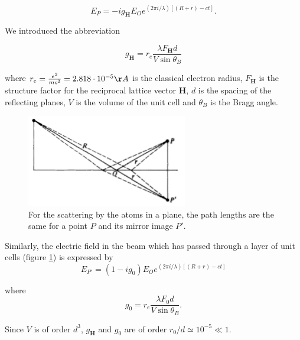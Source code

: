 \documentclass[12pt,oneside,notitlepage,abstracton,a4paper]{scrartcl}
\begin{document}
\begin{equation}
 E_P=-ig_\mathbf{H}E_Oe^{(2\pi i /\lambda)[(R+r)-ct]}.
\end{equation}

We introduced the abbreviation

\begin{equation}\label{eqg}
 g_\mathbf{H}=r_e\frac{\lambda F_\mathbf{H}d}{V \sin{\theta_B}}
\end{equation}

where $r_e=\frac{e^2}{mc^2}=2.818 \cdot 10^{-5} \AA{}$ is the classical electron radius, $F_\mathbf{H}$ is the structure factor for the reciprocal lattice vector $\mathbf{H}$, $d$ is the spacing of the reflecting planes, $V$ is the volume of the unit cell and $\theta_B$ is the Bragg angle.

\begin{figure}[h]
\begin{center}
\includegraphics[width=7cm]{pics/picture2.png}
\vspace{-10pt}
\caption{For the scattering by the atoms in a plane, the path lengths are the same for a point $P$ and its mirror image $P'$.}
\label{pic2}
\vspace{-10pt}
\end{center}
\end{figure}


Similarly, the electric field in the beam which has passed through a layer of unit cells (figure \ref{pic2}) is expressed by
\begin{equation}\label{Et}
 E_{P'}=(1-ig_0)E_Oe^{(2\pi i /\lambda)[(R+r)-ct]}
\end{equation}

where
\begin{equation} \label{eqg0}
 g_0=r_e\frac{\lambda F_0 d}{V \sin{\theta_B}}.
\end{equation}

Since $V$ is of order $d^3$, $g_\mathbf{H}$ and $g_0$ are of order $r_0/d \simeq 10^{-5} \ll 1$.

\newpage
\end{document}
